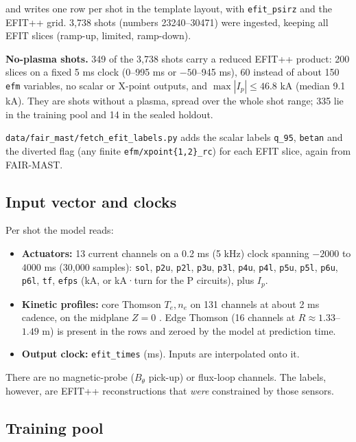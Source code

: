 \documentclass[11pt,a4paper]{article}
\numberwithin{equation}{section}
\begin{document}
and writes one row per shot in the template layout, with \texttt{efit\_psirz} and the EFIT++ grid. 3,738 shots (numbers 23240--30471) were ingested, keeping all EFIT slices (ramp-up, limited, ramp-down).

\textbf{No-plasma shots.} 349 of the 3,738 shots carry a reduced EFIT++ product: 200 slices on a fixed 5 ms clock (0--995 ms or \(-50\)--945 ms), 60 instead of about 150 \texttt{efm} variables, no scalar or X-point outputs, and \(\max|I_p|\le46.8\) kA (median 9.1 kA). They are shots without a plasma, spread over the whole shot range; 335 lie in the training pool and 14 in the sealed holdout.

\nolinkurl{data/fair_mast/fetch_efit_labels.py} adds the scalar labels \texttt{q\_95}, \texttt{betan} and the diverted flag (any finite \texttt{efm/xpoint\{1,2\}\_rc}) for each EFIT slice, again from FAIR-MAST.

\hypertarget{input-vector-and-clocks}{%
\subsection{Input vector and clocks}\label{input-vector-and-clocks}}

Per shot the model reads:

\begin{itemize}
\item
  \textbf{Actuators:} 13 current channels on a 0.2 ms (5 kHz) clock spanning \(-2000\) to \(4000\) ms (30,000 samples): \texttt{sol}, \texttt{p2u}, \texttt{p2l}, \texttt{p3u}, \texttt{p3l}, \texttt{p4u}, \texttt{p4l}, \texttt{p5u}, \texttt{p5l}, \texttt{p6u}, \texttt{p6l}, \texttt{tf}, \texttt{efps} (kA, or kA·turn for the P circuits), plus \(I_p\).
\item
  \textbf{Kinetic profiles:} core Thomson \(T_e, n_e\) on 131 channels at about 2 ms cadence, on the midplane \(Z=0\) \cite{scannell2010}. Edge Thomson (16 channels at \(R\approx1.33\)--\(1.49\) m) is present in the rows and zeroed by the model at prediction time.
\item
  \textbf{Output clock:} \texttt{efit\_times} (ms). Inputs are interpolated onto it.
\end{itemize}

There are no magnetic-probe (\(B_\theta\) pick-up) or flux-loop channels. The labels, however, are EFIT++ reconstructions that \emph{were} constrained by those sensors.

\hypertarget{training-pool}{%
\subsection{Training pool}\label{training-pool}}
\end{document}
